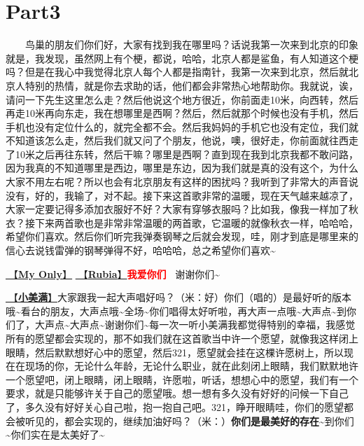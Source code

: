 \documentclass[]{ctexbook}
\begin{document}
\section{Part3}\label{beijing-20240922-part3}

  鸟巢的朋友们你们好，大家有找到我在哪里吗？话说我第一次来到北京的印象就是，我发现，虽然网上有个梗，都说，哈哈，北京人都是鲨鱼，有人知道这个梗吗？但是在我心中我觉得北京人每个人都是指南针，我第一次来到北京，然后就北京人特别的热情，就是你去求助的话，他们都会非常热心地帮助你。我就说，诶，请问一下先生这里怎么走？然后他说这个地方很近，你前面走10米，向西转，然后再走10米再向东走，我在想哪里是西啊？然后，然后就那个时候也没有手机，然后手机也没有定位什么的，就完全都不会。然后我妈妈的手机它也没有定位，我们就不知道该怎么走，然后我们就又问了个朋友，他说，噢，很好走，你前面就往西走了10米之后再往东转，然后干嘛？哪里是西啊？直到现在我到北京我都不敢问路，因为我真的不知道哪里是西边，哪里是东边，因为我们就是真的没有这个，为什么大家不用左右呢？所以也会有北京朋友有这样的困扰吗？我听到了非常大的声音说没有，好的，我输了，对不起。接下来这首歌非常的温暖，现在天气越来越凉了，大家一定要记得多添加衣服好不好？大家有穿够衣服吗？比如我，像我一样加了秋衣？接下来两首歌也是非常非常温暖的两首歌，它温暖的就像秋衣一样，哈哈哈，希望你们喜欢。然后你们听完我弹奏钢琴之后就会发现，哇，刚才到底是哪里来的信心去说钱雷弹的钢琴弹得不好，哈哈哈，总之希望你们喜欢\textasciitilde{}

\hyperref[my-only]{🎵【\textbf{My Only}】} \hyperref[rubia]{🎵【\textbf{Rubia}】}\textbf{\textcolor{red}{我爱你们~} } 谢谢你们\textasciitilde{}

\hyperref[happy-ending]{🎵【\textbf{小美满}】}大家跟我一起大声唱好吗？（米：好）你们（唱的）是最好听的版本哦\textasciitilde 看台的朋友，大声点哦\textasciitilde 全场\textasciitilde 你们唱得太好听啦，再大声一点哦\textasciitilde 大声点\textasciitilde 到你们了，大声点\textasciitilde 大声点\textasciitilde 谢谢你们\textasciitilde 每一次一听小美满我都觉得特别的幸福，我感觉所有的愿望都会实现的，那不如我们就在这首歌当中许一个愿望，就像我这样闭上眼睛，然后默默想好心中的愿望，然后321，愿望就会挂在这棵许愿树上，所以现在在现场的你，无论什么年龄，无论什么职业，就在此刻闭上眼睛，我们默默地许一个愿望吧，闭上眼睛，闭上眼睛，许愿啦，听话，想想心中的愿望，我们有一个要求，就是只能够许关于自己的愿望哦。想一想有多久没有好好的问候一下自己了，多久没有好好关心自己啦，抱一抱自己吧。321，睁开眼睛哇，你们的愿望都会被听见的，都会实现的，继续加油好吗？（米：）\textbf{你们是最美好的存在\textasciitilde{}}到你们\textasciitilde 你们实在是太美好了\textasciitilde{}
\end{document}
